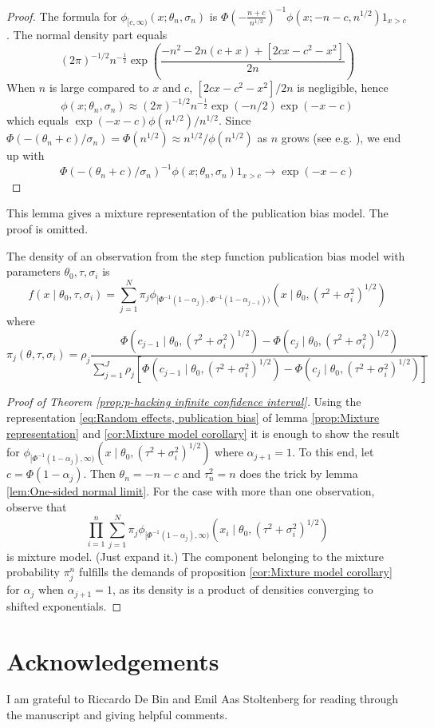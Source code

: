 \documentclass[twoside]{article}
\begin{document}
\begin{proof}
The formula for $\phi_{[c,\infty)}(x;\theta_{n},\sigma_{n})$
is $\Phi(-\frac{n+c}{n^{1/2}})^{-1}\phi(x;-n-c,n^{1/2})1_{x>c}$.
The normal density part equals 
\[
(2\pi)^{-1/2}n^{-\frac{1}{2}}\exp\left(\frac{-n^{2}-2n(c+x)+[2cx-c^{2}-x^{2}]}{2n}\right)
\]
When $n$ is large compared to $x$ and $c$, $[2cx-c^{2}-x^{2}]/2n$
is negligible, hence 
\[
\phi(x;\theta_{n},\sigma_{n})\approx(2\pi)^{-1/2}n^{-\frac{1}{2}}\exp(-n/2)\exp(-x-c)
\]
which equals $\exp(-x-c)\phi(n^{1/2})/n^{1/2}$.
Since $\Phi(-(\theta_{n}+c)/\sigma_{n})=\Phi(n^{1/2})\approx n^{1/2}/\phi(n^{1/2})$
as $n$ grows (see e.g. \citet[equation 5]{borjesson1979simple}),
we end up with $$\Phi(-(\theta_{n}+c)/\sigma_{n})^{-1}\phi(x;\theta_{n},\sigma_{n})1_{x>c}\to\exp(-x-c)$$
\end{proof}
%
This lemma gives a mixture representation of the publication bias
model. The proof is omitted.
\begin{lem}
\label{prop:Mixture representation} The density of an observation
from the step function publication bias model with parameters $\theta_{0},\tau,\sigma_{i}$
is
\begin{equation}
f(x\mid\theta_{0},\tau,\sigma_{i})=\sum_{j=1}^{N}\pi_{j}\phi_{[\Phi^{-1}(1-\alpha_{j}),\Phi^{-1}(1-\alpha_{j-1}))}(x\mid\theta_{0},(\tau^{2}+\sigma_{i}^{2})^{1/2})\label{eq:Random effects, publication bias}
\end{equation}
where 
\[
\pi_{j}(\theta,\tau,\sigma_{i})=\rho_{j}\frac{\Phi(c_{j-1}\mid\theta_{0},(\tau^{2}+\sigma_{i}^{2})^{1/2})-\Phi(c_{j}\mid\theta_{0},(\tau^{2}+\sigma_{i}^{2})^{1/2})}{\sum_{j=1}^{J}\rho_{j}[\Phi(c_{j-1}\mid\theta_{0},(\tau^{2}+\sigma_{i}^{2})^{1/2})-\Phi(c_{j}\mid\theta_{0},(\tau^{2}+\sigma_{i}^{2})^{1/2})]}
\]
\end{lem}

\begin{proof}[Proof of Theorem \ref{prop:p-hacking infinite confidence interval}]
Using the representation \ref{eq:Random effects, publication bias}
of lemma \ref{prop:Mixture representation} and \ref{cor:Mixture model corollary}
it is enough to show the result for $\phi_{[\Phi^{-1}(1-\alpha_{j}),\infty)}(x\mid\theta_{0},(\tau^{2}+\sigma_{i}^{2})^{1/2})$
where $\alpha_{j+1}=1$. To this end, let $c=\Phi(1-\alpha_{j})$.
Then $\theta_{n}=-n-c$ and $\tau_{n}^{2}=n$ does the trick by lemma
\ref{lem:One-sided normal limit}. For the case with more than one
observation, observe that 
\[
\prod_{i=1}^{n}\sum_{j=1}^{N}\pi_{j}\phi_{[\Phi^{-1}(1-\alpha_{j}),\infty)}(x_{i}\mid\theta_{0},(\tau^{2}+\sigma_{i}^{2})^{1/2})
\]
is mixture model. (Just expand it.) The component belonging to the
mixture probability $\pi_{j}^{n}$ fulfills the demands of proposition
\ref{cor:Mixture model corollary} for $\alpha_{j}$ when $\alpha_{j+1}=1$,
as its density is a product of densities converging to shifted exponentials.
\end{proof}


\section*{Acknowledgements}
I am grateful to Riccardo De Bin and Emil Aas Stoltenberg for reading through the manuscript and giving helpful comments.



\end{document}

